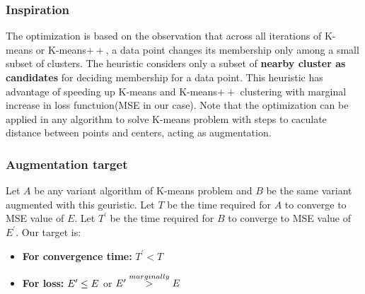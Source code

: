 \documentclass[11pt]{article}
\begin{document}
\subsubsection{Inspiration}
The optimization is based on the observation that across all iterations of K-means or K-means$++$, a data point changes its membership only among a small subset of clusters. The heuristic considers only a subset of \textbf{nearby cluster as candidates} for deciding membership for a data point. This heuristic has advantage of speeding up K-means and K-means$++$ clustering with marginal increase in loss functuion(MSE in our case). Note that the optimization can be applied in any algorithm to solve K-means problem with steps to caculate distance between points and centers, acting as augmentation.
\subsubsection{Augmentation target}
Let $A$ be any variant algorithm of K-means problem and $B$ be the same variant augmented with this geuristic. Let $T$ be the time required for $A$ to converge to MSE value of $E$. Let $T^{\prime}$ be the time required for $B$ to converge to MSE value of $E^{\prime}$. Our target is:
\begin{itemize}
\item \textbf{For convergence time:} $T^{\prime} < T$
\item \textbf{For loss:} $E^{\prime} \le E \space $ or $ \space E^{\prime} \overset{marginally}{>} E$
\end{itemize}
\end{document}

